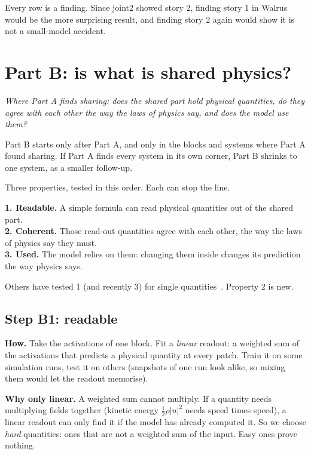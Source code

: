 \documentclass[11pt,a4paper]{article}
\newcommand{\question}[1]{%
  \vspace{0.4em}\begin{center}\begin{minipage}{0.85\textwidth}\setstretch{1.35}\large\itshape\color{ink}#1\end{minipage}\end{center}\vspace{0.5em}}
\begin{document}
Every row is a finding. Since joint2 showed story 2, finding story 1 in Walrus would be the more surprising result,
and finding story 2 again would show it is not a small-model accident.

\section{Part B: is what is shared physics?}
\label{sec:partB}

\question{Where Part A finds sharing: does the shared part hold physical quantities,
do they agree with each other the way the laws of physics say, and does the model use them?}

Part B starts only after Part A, and only in the blocks and systems where Part A found sharing.
If Part A finds every system in its own corner, Part B shrinks to one system, as a smaller follow-up.

Three properties, tested in this order. Each can stop the line.

\begin{keybox}
\textbf{1. Readable.} A simple formula can read physical quantities out of the shared part.\\[0.3em]
\textbf{2. Coherent.} Those read-out quantities agree with each other, the way the laws of physics say they must.\\[0.3em]
\textbf{3. Used.} The model relies on them: changing them inside changes its prediction the way physics says.
\end{keybox}

Others have tested 1 (and recently 3) for single quantities~\cite{liao2026, fear2025}. Property 2 is new.

\subsection*{Step B1: readable}

\textbf{How.} Take the activations of one block. Fit a \emph{linear} readout: a weighted sum of the activations that predicts a
physical quantity at every patch. Train it on some simulation runs, test it on others (snapshots of one run look alike,
so mixing them would let the readout memorise).

\textbf{Why only linear.} A weighted sum cannot multiply. If a quantity needs multiplying fields together
(kinetic energy $\tfrac12 \rho |u|^2$ needs speed times speed), a linear readout can only find it if the model has already computed it.
So we choose \emph{hard} quantities: ones that are not a weighted sum of the input. Easy ones prove nothing.
\end{document}
